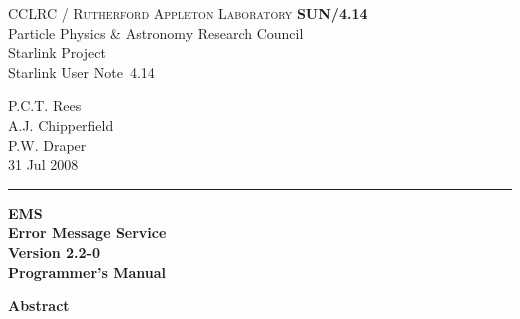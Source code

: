 \documentclass[twoside,11pt]{article}
\newcommand{\stardoccategory}  {Starlink User Note}
\newcommand{\stardocinitials}  {SUN}
\newcommand{\stardocnumber}    {4.14}
\newcommand{\stardocauthors}   {P.C.T. Rees \\
                                A.J. Chipperfield \\
                                P.W. Draper}
\newcommand{\stardocdate}      {31 Jul 2008}
\newcommand{\stardoctitle}     {EMS \\ [\latex{1ex}]
                                Error Message Service}
\newcommand{\stardocversion}   {Version 2.2-0}
\newcommand{\stardocmanual}    {Programmer's Manual}
\newcommand{\stardocname}{\stardocinitials /\stardocnumber}
\newenvironment{latexonly}{}{}
\newcommand{\latex}[1]{#1}
\renewcommand{\_}{\texttt{\symbol{95}}}
\begin{document}
\thispagestyle{empty}

\begin{latexonly}
   CCLRC / \textsc{Rutherford Appleton Laboratory} \hfill \textbf{\stardocname}\\
   {\large Particle Physics \& Astronomy Research Council}\\
   {\large Starlink Project\\}
   {\large \stardoccategory\ \stardocnumber}
   \begin{flushright}
   \stardocauthors\\
   \stardocdate
   \end{flushright}
   \vspace{-4mm}
   \rule{\textwidth}{0.5mm}
   \vspace{5mm}
   \begin{center}
   {\Huge\textbf{\stardoctitle \\ [2.5ex]}}
   {\LARGE\textbf{\stardocversion \\ [4ex]}}
   {\Huge\textbf{\stardocmanual}}
   \end{center}
   \vspace{5mm}


   \vspace{10mm}
   \begin{center}
      {\Large\textbf{Abstract}}
   \end{center}
\end{latexonly}
\end{document}
